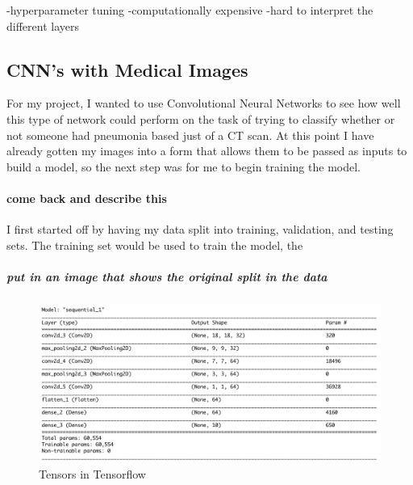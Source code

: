\documentclass[12pt]{article}
\begin{document}
-hyperparameter tuning -computationally expensive -hard to interpret the
different layers

\hypertarget{cnns-with-medical-images}{%
\subsection{CNN's with Medical Images}\label{cnns-with-medical-images}}

For my project, I wanted to use Convolutional Neural Networks to see how
well this type of network could perform on the task of trying to
classify whether or not someone had pneumonia based just of a CT scan.
At this point I have already gotten my images into a form that allows
them to be passed as inputs to build a model, so the next step was for
me to begin training the model.

\hypertarget{come-back-and-describe-this}{%
\paragraph{come back and describe
this}\label{come-back-and-describe-this}}

I first started off by having my data split into training, validation,
and testing sets. The training set would be used to train the model, the

\hypertarget{put-in-an-image-that-shows-the-original-split-in-the-data}{%
\subparagraph{put in an image that shows the original split in the
data}\label{put-in-an-image-that-shows-the-original-split-in-the-data}}

\begin{figure}

{\centering \includegraphics[width=0.75\linewidth,height=0.25\textheight]{images/dd/model} 

}

\caption{Tensors in Tensorflow}\label{fig:sample-fig6}
\end{figure}
\end{document}

